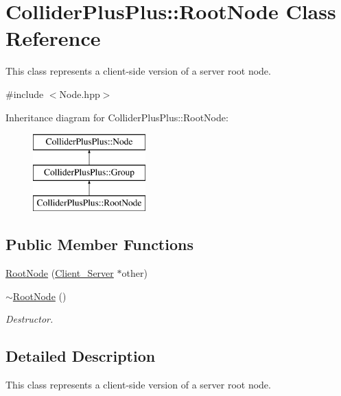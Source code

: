 \hypertarget{classColliderPlusPlus_1_1RootNode}{\section{Collider\-Plus\-Plus\-:\-:Root\-Node Class Reference}
\label{classColliderPlusPlus_1_1RootNode}
}


This class represents a client-\/side version of a server root node.  




{\ttfamily \#include $<$Node.\-hpp$>$}

Inheritance diagram for Collider\-Plus\-Plus\-:\-:Root\-Node\-:\begin{figure}[H]
\begin{center}
\leavevmode
\includegraphics[height=3.000000cm]{classColliderPlusPlus_1_1RootNode}
\end{center}
\end{figure}
\subsection*{Public Member Functions}
\begin{DoxyCompactItemize}
\item 
\hyperlink{classColliderPlusPlus_1_1RootNode_a646c4e811ff3af302eeed5cb808f7b5f}{Root\-Node} (\hyperlink{classColliderPlusPlus_1_1Client__Server}{Client\-\_\-\-Server} $\ast$other)
\item 
\hypertarget{classColliderPlusPlus_1_1RootNode_a0b1f3caa18d7176ec4766990cadb48c4}{\hyperlink{classColliderPlusPlus_1_1RootNode_a0b1f3caa18d7176ec4766990cadb48c4}{$\sim$\-Root\-Node} ()}\label{classColliderPlusPlus_1_1RootNode_a0b1f3caa18d7176ec4766990cadb48c4}

\begin{DoxyCompactList}\small\item\em Destructor. \end{DoxyCompactList}\end{DoxyCompactItemize}


\subsection{Detailed Description}
This class represents a client-\/side version of a server root node. 

